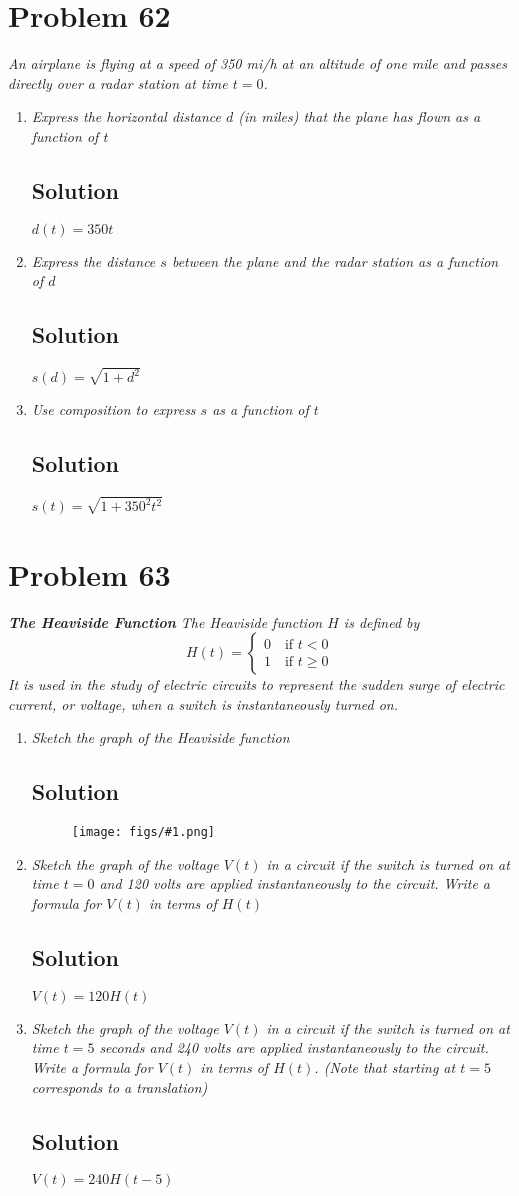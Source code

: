 \documentclass[11pt]{article}
\newcommand{\soln}{\subsection*}
\newcommand{\qn}{\textit}
\newcommand{\imgsoln}[1]{
	\begin{figure}[H]
		\centering
		\texttt{[image: figs/\#1.png]}
	\end{figure}
}
\begin{document}
\section*{Problem 62}

\qn{An airplane is flying at a speed of 350 mi/h at an altitude of one mile and passes directly over a radar station at time $t=0$.}

\begin{enumerate}
	\item \qn{Express the horizontal distance $d$ (in miles) that the plane has flown as a function of $t$}
	\soln{Solution}
	$d(t)=350t$
	
	\item \qn{Express the distance $s$ between the plane and the radar station as a function of $d$}
	\soln{Solution}
	$s(d)=\sqrt{1+d^2}$
	
	\item \qn{Use composition to express $s$ as a function of $t$}
	\soln{Solution}
	$s(t)=\sqrt{1+350^2t^2}$
\end{enumerate}

\section*{Problem 63}

\qn{\textbf{The Heaviside Function} The Heaviside function $H$ is defined by $$H(t)=\begin{cases} 0 \quad\text{if }t<0 \\ 1 \quad\text{if }t \ge 0\end{cases}$$ It is used in the study of electric circuits to represent the sudden surge of electric current, or voltage, when a switch is instantaneously turned on.}

\begin{enumerate}
	\item \qn{Sketch the graph of the Heaviside function}
	\soln{Solution}
	\imgsoln{1.3.63-ans.a}
	
	\item \qn{Sketch the graph of the voltage $V(t)$ in a circuit if the switch is turned on at time $t=0$ and 120 volts are applied instantaneously to the circuit. Write a formula for $V(t)$ in terms of $H(t)$}
	\soln{Solution}
	$V(t)=120H(t)$
	
	\item \qn{Sketch the graph of the voltage $V(t)$ in a circuit if the switch is turned on at time $t=5$ seconds and 240 volts are applied instantaneously to the circuit. Write a formula for $V(t)$ in terms of $H(t)$. (Note that starting at $t=5$ corresponds to a translation)}
	\soln{Solution}
	$V(t)=240H(t-5)$
\end{enumerate}
\end{document}
